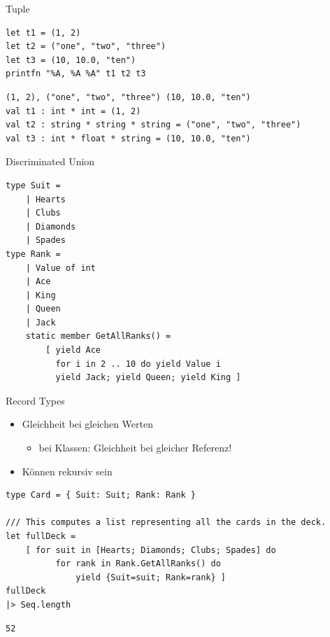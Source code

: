 \documentclass[t]{beamer}
\begin{document}
\begin{frame}[label={sec:org997b234},fragile]{Tuple}
 \begin{verbatim}
let t1 = (1, 2)
let t2 = ("one", "two", "three")
let t3 = (10, 10.0, "ten")
printfn "%A, %A %A" t1 t2 t3
\end{verbatim}

\begin{verbatim}
(1, 2), ("one", "two", "three") (10, 10.0, "ten")
val t1 : int * int = (1, 2)
val t2 : string * string * string = ("one", "two", "three")
val t3 : int * float * string = (10, 10.0, "ten")
\end{verbatim}
\end{frame}

\begin{frame}[label={sec:orgcd0f217},fragile]{Discriminated Union}
 \begin{verbatim}
type Suit = 
    | Hearts 
    | Clubs 
    | Diamonds 
    | Spades
type Rank = 
    | Value of int
    | Ace
    | King
    | Queen
    | Jack
    static member GetAllRanks() = 
        [ yield Ace
          for i in 2 .. 10 do yield Value i
          yield Jack; yield Queen; yield King ]
\end{verbatim}
\end{frame}

\begin{frame}[label={sec:org6160a2f},fragile]{Record Types}
 \begin{itemize}
\item Gleichheit bei gleichen Werten 
\begin{itemize}
\item bei Klassen: Gleichheit bei gleicher Referenz!
\end{itemize}
\item Können rekursiv sein
\end{itemize}

\begin{verbatim}
type Card = { Suit: Suit; Rank: Rank }

/// This computes a list representing all the cards in the deck.
let fullDeck = 
    [ for suit in [Hearts; Diamonds; Clubs; Spades] do
          for rank in Rank.GetAllRanks() do 
              yield {Suit=suit; Rank=rank} ]
fullDeck 
|> Seq.length
\end{verbatim}

\begin{verbatim}
52
\end{verbatim}
\end{frame}
\end{document}
